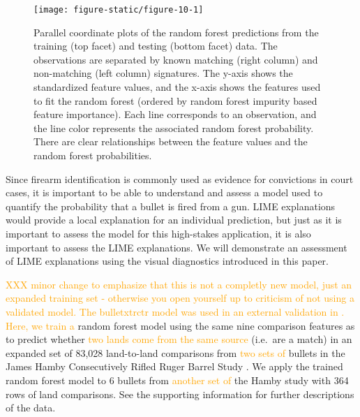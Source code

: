 \documentclass[AMS,STIX2COL]{WileyNJD-v2}\usepackage[]{graphicx}\usepackage[]{color}
\newenvironment{knitrout}{}{} %
\newcommand{\hh}[1]{\textcolor{orange}{#1}}
\begin{document}
\begin{figure}[!thp]
\begin{knitrout}
\color{fgcolor}

{\centering \texttt{[image: figure-static/figure-10-1]} 

}



\end{knitrout}
\caption{Parallel coordinate plots of the \citet{hare:2017} random forest predictions from the training (top facet) and testing (bottom facet) data. The observations are separated by known matching (right column) and non-matching (left column) signatures. The y-axis shows the standardized feature values, and the x-axis shows the features used to fit the random forest (ordered by random forest impurity based feature importance). Each line corresponds to an observation, and the line color represents the associated random forest probability. There are clear relationships between the feature values and the random forest probabilities.}
\label{fig:figure-10}
\end{figure}

Since firearm identification is commonly used as evidence for convictions in court cases, it is important to be able to understand and assess a model used to quantify the probability that a bullet is fired from a gun. LIME explanations would provide a local explanation for an individual prediction, but just as it is important to assess the model for this high-stakes application, it is also important to assess the LIME explanations. We will demonstrate an assessment of LIME explanations using the visual diagnostics introduced in this paper.


\hh{XXX minor change to emphasize that this is not a completly new model, just an expanded training set - otherwise you open yourself up to criticism of not using a validated model. The bulletxtrctr model was used in an external validation in \citet{validation}. }
\hh{Here, we train a } random forest model using the same nine comparison features as \citet{hare:2017} to predict whether  \hh{two lands come from the same source} (i.e.\ are a match) in an expanded set of 83,028 land-to-land comparisons from \hh{two sets of} bullets in the James Hamby Consecutively Rifled Ruger Barrel Study \citep{hamby:2009}. We apply the trained random forest model to 6 bullets from \hh{another set of} the Hamby study with 364 rows of land comparisons. See the supporting information for further descriptions of the data.
\end{document}
